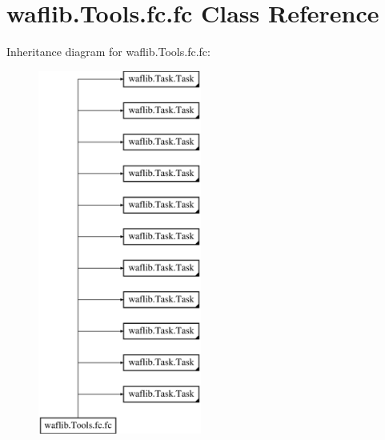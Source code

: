 \hypertarget{classwaflib_1_1_tools_1_1fc_1_1fc}{}\section{waflib.\+Tools.\+fc.\+fc Class Reference}
\label{classwaflib_1_1_tools_1_1fc_1_1fc}
Inheritance diagram for waflib.\+Tools.\+fc.\+fc\+:\begin{figure}[H]
\begin{center}
\leavevmode
\includegraphics[height=12.000000cm]{classwaflib_1_1_tools_1_1fc_1_1fc}
\end{center}
\end{figure}
